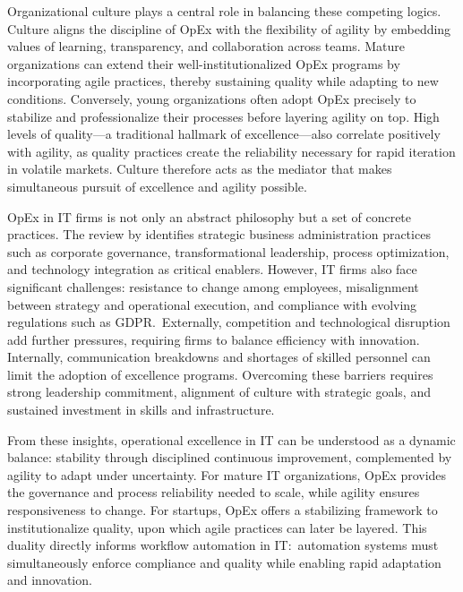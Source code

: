 Organizational culture plays a central role in balancing these competing logics. Culture aligns the discipline of OpEx with the flexibility of agility by embedding values of learning, transparency, and collaboration across teams. Mature organizations can extend their well-institutionalized OpEx programs by incorporating agile practices, thereby sustaining quality while adapting to new conditions. Conversely, young organizations often adopt OpEx precisely to stabilize and professionalize their processes before layering agility on top. High levels of quality---a traditional hallmark of excellence---also correlate positively with agility, as quality practices create the reliability necessary for rapid iteration in volatile markets. Culture therefore acts as the mediator that makes simultaneous pursuit of excellence and agility possible.

OpEx in IT firms is not only an abstract philosophy but a set of concrete practices. The review by \textcite{owoadeSystematic2024} identifies strategic business administration practices such as corporate governance, transformational leadership, process optimization, and technology integration as critical enablers. However, IT firms also face significant challenges: resistance to change among employees, misalignment between strategy and operational execution, and compliance with evolving regulations such as GDPR.~Externally, competition and technological disruption add further pressures, requiring firms to balance efficiency with innovation. Internally, communication breakdowns and shortages of skilled personnel can limit the adoption of excellence programs. Overcoming these barriers requires strong leadership commitment, alignment of culture with strategic goals, and sustained investment in skills and infrastructure.

From these insights, operational excellence in IT can be understood as a dynamic balance: stability through disciplined continuous improvement, complemented by agility to adapt under uncertainty. For mature IT organizations, OpEx provides the governance and process reliability needed to scale, while agility ensures responsiveness to change. For startups, OpEx offers a stabilizing framework to institutionalize quality, upon which agile practices can later be layered. This duality directly informs workflow automation in IT:~automation systems must simultaneously enforce compliance and quality while enabling rapid adaptation and innovation.

